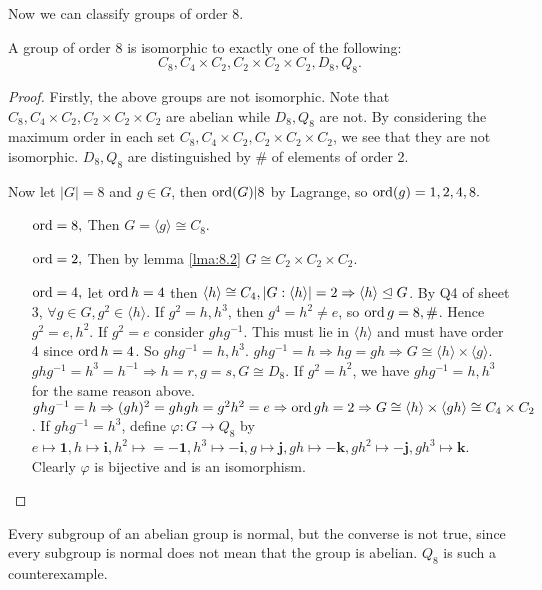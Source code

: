 \documentclass[a4paper]{article}
\begin{document}
Now we can classify groups of order 8.
\begin{theorem}\label{thm:8.3}
  A group of order 8 is isomorphic to exactly one of the following:
  \[
    C_8, C_4 \times C_2,C_2 \times C_2 \times C_2, D_8, Q_8.
  \]
\end{theorem}
\begin{proof}
  Firstly, the above groups are not isomorphic. Note that $  C_8, C_4
  \times C_2,C_2 \times C_2 \times C_2$ are abelian while $D_8, Q_8$
  are not. By considering the maximum order in each set $ C_8, C_4
  \times C_2,C_2 \times C_2 \times C_2 $, we see that they are not
  isomorphic. $D_8, Q_8$ are distinguished by \# of elements of order 2.

  Now let $ |G|=8 $ and $g\in G$, then $ \operatorname{ord}(G)|8 $ by Lagrange, so
  $ \operatorname{ord}(g)=1,2,4,8. $
  \begin{enumerate}
    \item[$ \operatorname{ord}=8 ,$] Then $ G=\langle g \rangle \cong C_8 $.
    \item[$ \operatorname{ord}=2 ,$] Then by lemma \ref{lma:8.2} $ G \cong
      C_2\times C_2 \times C_2 $.
    \item[$ \operatorname{ord}=4, $] let $\operatorname{ord} h=4$ then $ \langle h \rangle \cong
      C_4, |G:\langle h \rangle |=2 \Rightarrow \langle h \rangle
      \trianglelefteq G $. By Q4 of sheet 3, $ \forall g\in G, g^2\in
      \langle h \rangle $. If $ g^2=h,h^3 $, then $ g^4=h^2\neq e $,
      so $ \operatorname{ord} g=8,\# $. Hence $g^2=e,h^2$. If $g^2=e$ consider $
      ghg^{-1} $. This must lie in $ \langle h \rangle $ and must
      have order 4 since $\operatorname{ord} h=4$. So $ ghg^{-1}=h,h^3 $. $
      ghg^{-1}=h \Rightarrow hg=gh \Rightarrow G \cong \langle h
      \rangle \times \langle g \rangle $. $ ghg^{-1}=h^3=h^{-1}
      \Rightarrow h=r,g=s, G \cong D_8 $. If $g^2=h^2$, we have $
      ghg^{-1}=h,h^3 $ for the same reason above. $ ghg^{-1}=h
      \Rightarrow (gh)^2=ghgh=g^2h^2=e \Rightarrow \operatorname{ord} gh=2
      \Rightarrow G \cong \langle h \rangle \times \langle gh \rangle
      \cong C_4 \times C_2 $. If $ ghg^{-1}=h^3  $, define $ \varphi:
      G\to Q_8 $ by $ e \mapsto \mathbf{1}, h \mapsto \mathbf{i},h^2
      \mapsto =-\mathbf{1}, h^3 \mapsto - \mathbf{i}, g \mapsto
      \mathbf{j},gh \mapsto - \mathbf{k}, gh^2 \mapsto -\mathbf{j},
      gh^3 \mapsto \mathbf{k} $. Clearly $\varphi$ is bijective and
      is an isomorphism.
  \end{enumerate}
\end{proof}
\begin{remark}
  Every subgroup of an abelian group is normal, but the converse is
  not true, since every subgroup is normal does not mean that the
  group is abelian. $ Q_8 $ is such a counterexample.
\end{remark}
\end{document}
